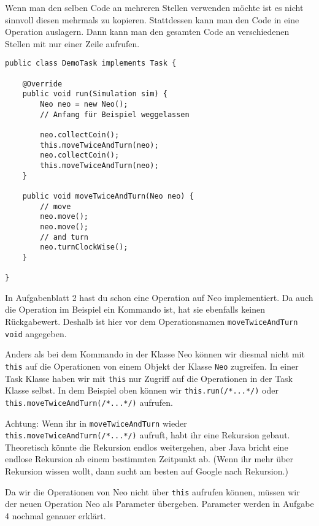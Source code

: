 \begin{Infobox}
	Wenn man den selben Code an mehreren Stellen verwenden möchte ist es nicht sinnvoll diesen mehrmals zu kopieren. 
	Stattdessen kann man den Code in eine Operation auslagern. 
	Dann kann man den gesamten Code an verschiedenen Stellen mit nur einer Zeile aufrufen.
	
	\begin{lstlisting}[xleftmargin=0.5cm]
public class DemoTask implements Task {
    
    @Override
    public void run(Simulation sim) {
        Neo neo = new Neo();
        // Anfang für Beispiel weggelassen
        
        neo.collectCoin();
        this.moveTwiceAndTurn(neo);
        neo.collectCoin();
        this.moveTwiceAndTurn(neo);
    }
    
    public void moveTwiceAndTurn(Neo neo) {
        // move
        neo.move();
        neo.move();
        // and turn
        neo.turnClockWise();
    }
    
}
	\end{lstlisting}

	In Aufgabenblatt 2 hast du schon eine Operation auf Neo implementiert.
	Da auch die Operation im Beispiel ein Kommando ist, hat sie ebenfalls keinen Rückgabewert.
	Deshalb ist hier vor dem Operationsnamen \lstinline{moveTwiceAndTurn} \lstinline{void} angegeben.

	Anders als bei dem Kommando in der Klasse Neo können wir diesmal nicht mit \lstinline{this} auf die Operationen von einem Objekt der Klasse \lstinline{Neo} zugreifen.
	In einer Task Klasse haben wir mit \lstinline{this} nur Zugriff auf die Operationen in der Task Klasse selbst.
	In dem Beispiel oben können wir \lstinline{this.run(/*...*/)} oder \lstinline{this.moveTwiceAndTurn(/*...*/)} aufrufen.

	Achtung: Wenn ihr in \lstinline{moveTwiceAndTurn} wieder \lstinline{this.moveTwiceAndTurn(/*...*/)} aufruft, habt ihr eine Rekursion gebaut.
	Theoretisch könnte die Rekursion endlos weitergehen, aber Java bricht eine endlose Rekursion ab einem bestimmten Zeitpunkt ab.
	(Wenn ihr mehr über Rekursion wissen wollt, dann sucht am besten auf Google nach Rekursion.)

	Da wir die Operationen von Neo nicht über \lstinline{this} aufrufen können, müssen wir der neuen Operation Neo als Parameter übergeben.
	Parameter werden in Aufgabe 4 nochmal genauer erklärt.
\end{Infobox}



